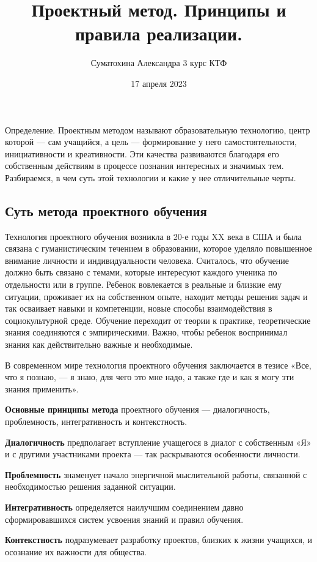 \documentclass[a4paper, 12pt]{extarticle}
\title{Проектный метод. Принципы и правила реализации.}
\author{Суматохина Александра 3 курс КТФ}
\date{17 апреля 2023}
\begin{document}
\maketitle

Определение. Проектным методом называют образовательную технологию, центр которой — сам учащийся, а цель — формирование у него самостоятельности, инициативности и креативности. Эти качества развиваются благодаря его собственным действиям в процессе познания интересных и значимых тем. Разбираемся, в чем суть этой технологии и какие у нее отличительные черты.
\subsection*{Суть метода проектного обучения}

Технология проектного обучения возникла в 20-е годы XX века в США и была связана с гуманистическим течением в образовании, которое уделяло повышенное внимание личности и индивидуальности человека. Считалось, что обучение должно быть связано с темами, которые интересуют каждого ученика по отдельности или в группе. Ребенок вовлекается в реальные и близкие ему ситуации, проживает их на собственном опыте, находит методы решения задач и так осваивает навыки и компетенции, новые способы взаимодействия в социокультурной среде. Обучение переходит от теории к практике, теоретические знания соединяются с эмпирическими. Важно, чтобы ребенок воспринимал знания как действительно важные и необходимые.

    В современном мире технология проектного обучения заключается в тезисе «Все, что я познаю, — я знаю, для чего это мне надо, а также где и как я могу эти знания применить».

    \textbf{Основные принципы метода} проектного обучения — диалогичность, проблемность, интегративность и контекстность.

    \textbf{Диалогичность} предполагает вступление учащегося в диалог с собственным «Я» и с другими участниками проекта — так раскрываются особенности личности.

    \textbf{Проблемность} знаменует начало энергичной мыслительной работы, связанной с необходимостью решения заданной ситуации.

    \textbf{Интегративность} определяется наилучшим соединением давно сформировавшихся систем усвоения знаний и правил обучения.

    \textbf{Контекстность} подразумевает разработку проектов, близких к жизни учащихся, и осознание их важности для общества.
\end{document}
